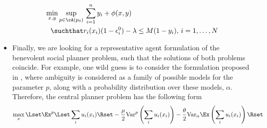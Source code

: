 \begin{itemize}
\begin{align}\label{formr1}
\min_{x,y}\sup_{p\in\cA(p_0)}&\,\sum_{i=1}^n y_i+\phi(x,y)\\
\suchthat&r_i(x_i)(1-\epsilon^0_i)-\lambda\leq M(1-y_i),\,i=1,\ldots,N
\end{align}
\item Finally, we are looking for a representative agent formulation of the benevolent social planner problem, such that the solutions of both problems coincide.  For example, one wild guess is to consider the formulation proposed in \cite{?} , where ambiguity is considered as a  family of possible models for the parameter $p$, along with a probability distribution over these models, $\alpha$.  Therefore, the central planner problem has the following form
\[\max_x\Lset \Ex^p\Lset\sum_i u_i(x_i)\Rset -\frac{\mu}{2}{\rm Var}^p\left(\sum_i u_i(x_i)\right)-\frac{\theta}{2}{\rm Var}_\alpha\Ex\left(\sum_i u_i(x_i)\right)\Rset\] 
\end{itemize}